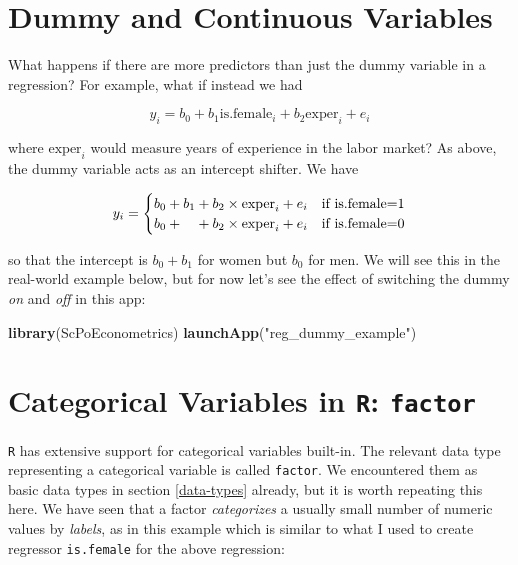 \documentclass[]{book}
\newenvironment{Shaded}{\begin{snugshade}}{\end{snugshade}}
\newcommand{\KeywordTok}[1]{\textcolor[rgb]{0.13,0.29,0.53}{\textbf{#1}}}
\newcommand{\StringTok}[1]{\textcolor[rgb]{0.31,0.60,0.02}{#1}}
\newcommand{\NormalTok}[1]{#1}
\begin{document}
\section{Dummy and Continuous
Variables}\label{dummy-and-continuous-variables}

What happens if there are more predictors than just the dummy variable
in a regression? For example, what if instead we had

\begin{equation}
y_i = b_0 + b_1 \text{is.female}_i + b_2 \text{exper}_i + e_i \label{eq:dummy-reg2}
\end{equation}

where \(\text{exper}_i\) would measure years of experience in the labor
market? As above, the dummy variable acts as an intercept shifter. We
have

\begin{equation}
y_i =  \begin{cases}
b_0 + b_1 + b_2 \times \text{exper}_i + e_i & \text{if is.female=1} \\
b_0  + \hphantom{b_1} +b_2 \times \text{exper}_i + e_i & \text{if is.female=0}
\end{cases}
\end{equation}

so that the intercept is \(b_0 + b_1\) for women but \(b_0\) for men. We
will see this in the real-world example below, but for now let's see the
effect of switching the dummy \emph{on} and \emph{off} in this app:

\begin{Shaded}
\begin{Highlighting}[]
\KeywordTok{library}\NormalTok{(ScPoEconometrics)}
\KeywordTok{launchApp}\NormalTok{(}\StringTok{"reg_dummy_example"}\NormalTok{)}
\end{Highlighting}
\end{Shaded}

\section{\texorpdfstring{Categorical Variables in \texttt{R}:
\texttt{factor}}{Categorical Variables in R: factor}}\label{categorical-variables-in-r-factor}

\texttt{R} has extensive support for categorical variables built-in. The
relevant data type representing a categorical variable is called
\texttt{factor}. We encountered them as basic data types in section
\ref{data-types} already, but it is worth repeating this here. We have
seen that a factor \emph{categorizes} a usually small number of numeric
values by \emph{labels}, as in this example which is similar to what I
used to create regressor \texttt{is.female} for the above regression:
\end{document}
